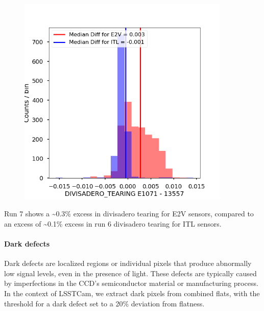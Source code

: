 \begin{figure}
\begin{centering}
\includegraphics[width=0.9\textwidth]{sections/figures/baselineCharacterization/DIVISADERO_TEARING_13557_E1071_diff.png}
\end{centering}
\end{figure}

Run 7 shows a \textasciitilde0.3\% excess in divisadero tearing for E2V
sensors, compared to an excess of \textasciitilde0.1\% excess in run 6
divisadero tearing for ITL sensors.

\paragraph{Dark defects}\label{dark-defects}

Dark defects are localized regions or individual pixels that produce
abnormally low signal levels, even in the presence of light. These
defects are typically caused by imperfections in the CCD's semiconductor
material or manufacturing process. In the context of LSSTCam, we extract
dark pixels from combined flats, with the threshold for a dark defect
set to a 20\% deviation from flatness.

